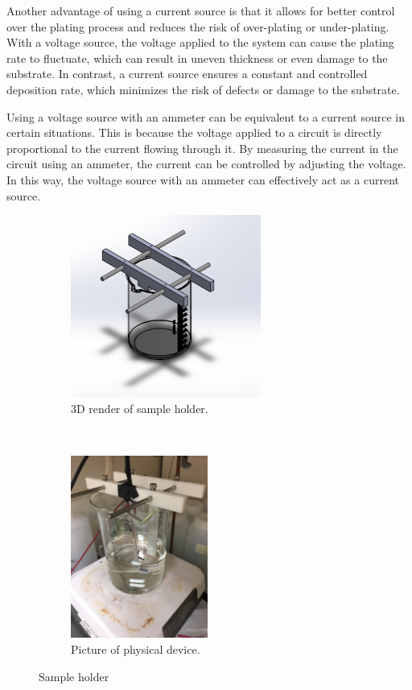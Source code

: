 Another advantage of using a current source is that it allows for better control over the plating process and reduces the risk of over-plating or under-plating. With a voltage source, the voltage applied to the system can cause the plating rate to fluctuate, which can result in uneven thickness or even damage to the substrate. In contrast, a current source ensures a constant and controlled deposition rate, which minimizes the risk of defects or damage to the substrate.

Using a voltage source with an ammeter can be equivalent to a current source in certain situations. This is because the voltage applied to a circuit is directly proportional to the current flowing through it. By measuring the current in the circuit using an ammeter, the current can be controlled by adjusting the voltage. In this way, the voltage source with an ammeter can effectively act as a current source.


\begin{figure}
    \centering
    \begin{subfigure}{0.55\textwidth}
        \centering
        \includegraphics[height=6cm]{Main/Ch1/electroplating_setup.png}
        \caption{3D render of sample holder.}
    \end{subfigure}
    ~
    \begin{subfigure}{0.35\textwidth}
        \centering
        \includegraphics[height=6cm]{Main/Ch1/electroplating_setup_picture.png}
        \caption{Picture of physical device.}
    \end{subfigure}
    \caption{Sample holder}
\end{figure}

